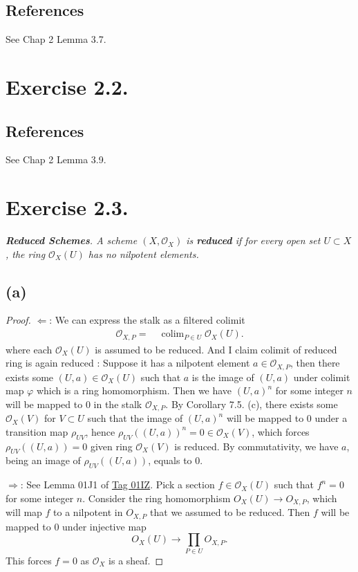 \subsection{References}

See \cite{qing2006algebraic} Chap 2 Lemma 3.7. 

\section{Exercise 2.2.}

\subsection{References}

See \cite{qing2006algebraic} Chap 2 Lemma 3.9.

\section{Exercise 2.3.}
\textit{\textbf{Reduced Schemes}. A scheme $(X,\mathcal O_X)$ is \textbf{reduced} if for every open set $U\subset X$, the ring $\mathcal O_X(U)$ has no nilpotent elements.}

\subsection{(a)}

\begin{proof}
    $\Leftarrow$:
    We can express the stalk as a filtered colimit 
    \begin{align*}
        \mathcal O_{X,P}
        =&~ \operatorname{colim}_{P\in U}\mathcal O_X(U).
    \end{align*} where each $\mathcal O_X(U)$ is assumed to be reduced. 
    And I claim colimit of reduced ring is again reduced :
    Suppose it has a nilpotent element $a\in\mathcal O_{X,P}$, then there exists some $(U,a)\in \mathcal O_X(U)$ such that $a$ is the image of $(U,a)$ under colimit map $\varphi$ which is a ring homomorphism. Then we have $(U,a)^n$ for some integer $n$ will be mapped to $0$ in the stalk $\mathcal O_{X,P}$. By \cite{altman2013term} Corollary 7.5. (c), there exists some $\mathcal O_X(V)$ for $V\subset U$ such that the image of $(U,a)^n$ will be mapped to $0$ under a transition map $\rho_{UV}$, hence $\rho_{UV}((U,a))^n=0\in\mathcal O_X(V)$, which forces $\rho_{UV}((U,a))=0$ given ring $\mathcal O_X(V)$ is reduced. By commutativity, we have $a$, being an image of $\rho_{UV}((U,a))$, equals to $0$. 

    $\Rightarrow$: 
    See Lemma 01J1 of \href{https://stacks.math.columbia.edu/tag/01IZ}{Tag 01IZ}. 
    Pick a section $f\in\mathcal O_X(U)$ such that $f^n=0$ for some integer $n$. 
    Consider the ring homomorphism $O_X(U)\to O_{X,P}$, which will map $f$ to a nilpotent in $O_{X,P}$ that we assumed to be reduced. Then $f$ will be mapped to $0$ under injective map 
    \[O_X(U)\to \prod_{P\in U}O_{X,P}.\] This forces $f=0$ as $\mathcal O_X$ is a sheaf.
    

\end{proof} 

